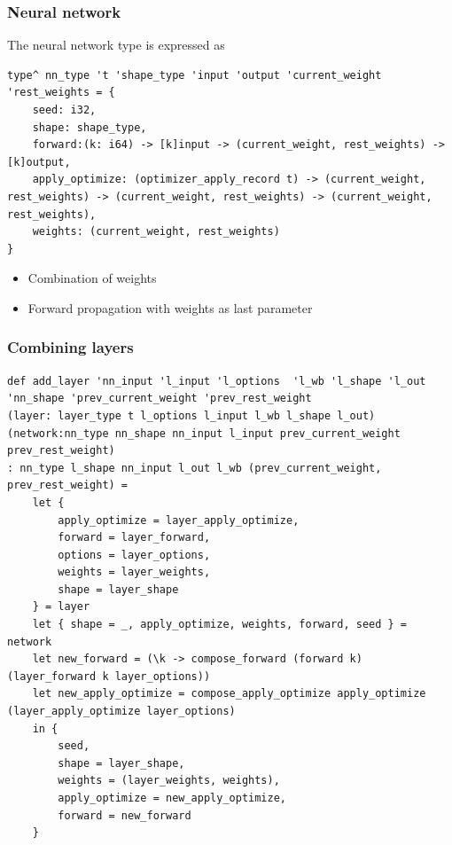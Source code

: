 \documentclass{beamer}
\begin{document}
\begin{frame}[fragile]
    \frametitle{Neural network}
    
    The neural network type is expressed as

    \begin{lstlisting}[basicstyle=\tiny]
type^ nn_type 't 'shape_type 'input 'output 'current_weight 'rest_weights = {
    seed: i32,
    shape: shape_type,
    forward:(k: i64) -> [k]input -> (current_weight, rest_weights) -> [k]output,
    apply_optimize: (optimizer_apply_record t) -> (current_weight, rest_weights) -> (current_weight, rest_weights) -> (current_weight, rest_weights),
    weights: (current_weight, rest_weights)
}
    \end{lstlisting}

    \begin{itemize}
        \item Combination of weights
        \item Forward propagation with weights as last parameter
    \end{itemize}
\end{frame}

\begin{frame}[fragile]
    \frametitle{Combining layers}
    
    \begin{lstlisting}[basicstyle=\tiny]
def add_layer 'nn_input 'l_input 'l_options  'l_wb 'l_shape 'l_out 'nn_shape 'prev_current_weight 'prev_rest_weight
(layer: layer_type t l_options l_input l_wb l_shape l_out)
(network:nn_type nn_shape nn_input l_input prev_current_weight prev_rest_weight)
: nn_type l_shape nn_input l_out l_wb (prev_current_weight, prev_rest_weight) =
    let {
        apply_optimize = layer_apply_optimize,
        forward = layer_forward,
        options = layer_options,
        weights = layer_weights,
        shape = layer_shape
    } = layer
    let { shape = _, apply_optimize, weights, forward, seed } = network
    let new_forward = (\k -> compose_forward (forward k) (layer_forward k layer_options))
    let new_apply_optimize = compose_apply_optimize apply_optimize (layer_apply_optimize layer_options)
    in {
        seed,
        shape = layer_shape,
        weights = (layer_weights, weights),
        apply_optimize = new_apply_optimize,
        forward = new_forward
    }
    \end{lstlisting}
\end{frame}

%     
\end{document}
